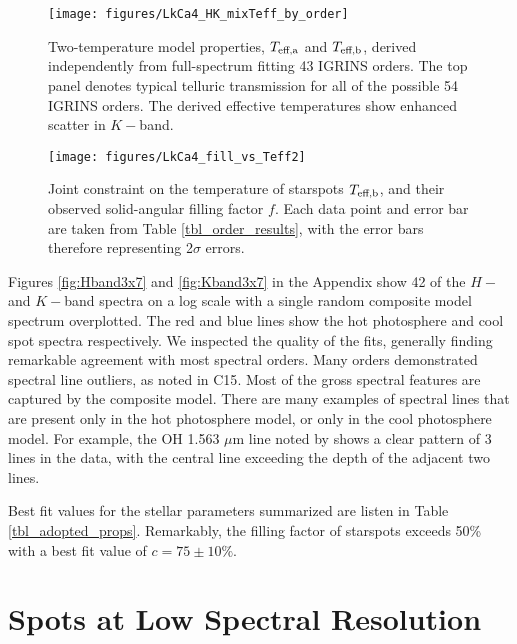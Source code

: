 \documentclass[twocolumn]{emulateapj}%
\newcommand{\iancze}{{\sc C15}}
\begin{document}


\begin{figure*}
	\centering
	\texttt{[image: figures/LkCa4\_HK\_mixTeff\_by\_order]} 
	\caption{Two-temperature model properties, $T_\textrm{eff,a}$ and $T_\textrm{eff,b}$, derived independently from full-spectrum fitting 43 IGRINS orders.  The top panel denotes typical telluric transmission for all of the possible 54 IGRINS orders.  The derived effective temperatures show enhanced scatter in $K-$band.}
	\label{fig:TwoTempResults}
\end{figure*}



\begin{figure*}
	\centering
	\texttt{[image: figures/LkCa4\_fill\_vs\_Teff2]} 
	\caption{Joint constraint on the temperature of starspots $T_\textrm{eff,b}$, and their observed solid-angular filling factor $f$.  Each data point and error bar are taken from Table \ref{tbl_order_results}, with the error bars therefore representing 2$\sigma$ errors.}
	\label{fig:TwoTempResults}
\end{figure*}

Figures \ref{fig:Hband3x7} and \ref{fig:Kband3x7} in the Appendix show 42 of the $H-$ and $K-$band spectra on a log scale with a single random composite model spectrum overplotted.  The red and blue lines show the hot photosphere and cool spot spectra respectively.  We inspected the quality of the fits, generally finding remarkable agreement with most spectral orders.  Many orders demonstrated spectral line outliers, as noted in \iancze.  Most of the gross spectral features are captured by the composite model.  There are many examples of spectral lines that are present only in the hot photosphere model, or only in the cool photosphere model.  For example, the OH 1.563 $\mu$m line noted by \citet{oneal01} shows a clear pattern of 3 lines in the data, with the central line exceeding the depth of the adjacent two lines.  

Best fit values for the stellar parameters summarized are listen in Table \ref{tbl_adopted_props}.  Remarkably, the filling factor of starspots exceeds 50\% with a best fit value of $c=75\pm 10 \% $.




\section{Spots at Low Spectral Resolution}
\end{document}

